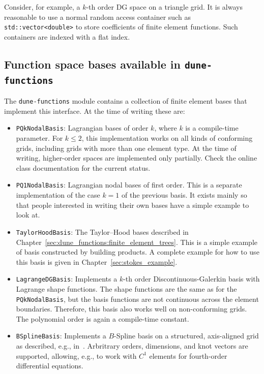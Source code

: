 \documentclass[a4paper,10pt,headings=normal,bibliography=totoc]{scrartcl}
\newcommand{\cpp}[1]{\lstinline[basicstyle=\ttfamily]!#1!}
\newcommand{\dunemodule}[1]{\texttt{#1}}
\begin{document}
Consider, for example, a $k$-th order DG space on a triangle grid.  It is always reasonable to use a normal
random access container such as \cpp{std::vector<double>} to store coefficients of finite element functions.
Such containers are indexed with a flat index.


\subsection{Function space bases available in \texorpdfstring{\dunemodule{dune-functions}}{dune-functions}}

The \dunemodule{dune-functions} module contains a collection of finite element bases that implement
this interface.  At the time of writing these are:

\begin{itemize}
 \item \cpp{PQkNodalBasis}: Lagrangian bases of order $k$, where $k$ is a compile-time parameter.
   For $k\le 2$, this implementation works on all kinds of conforming grids, including grids with more
   than one element type.  At the time of writing, higher-order spaces are implemented only partially.
   Check the online class documentation for the current status.

 \item \cpp{PQ1NodalBasis}: Lagrangian nodal bases of first order.  This is a separate implementation of
   the case $k=1$ of the previous basis.  It exists mainly so that people interested in writing their
   own bases have a simple example to look at.

 \item \cpp{TaylorHoodBasis}: The Taylor--Hood bases described in Chapter~\ref{sec:dune_functions:finite_element_trees}.
   This is a simple example of basis constructed by building products.
   A complete example for how to use this basis is given in Chapter~\ref{sec:stokes_example}.

 \item \cpp{LagrangeDGBasis}: Implements a $k$-th order Discontinuous-Galerkin basis with Lagrange shape functions.
   The shape functions are the same as for the \cpp{PQkNodalBasis},
   but the basis functions are not continuous across the element boundaries.  Therefore, this basis also
   works well on non-conforming grids.  The polynomial order is again a compile-time constant.

 \item \cpp{BSplineBasis}:  Implements a $B$-Spline basis on a structured, axis-aligned grid as described,
   e.g., in~\cite{cottrell_hughes_bazilevs:2009}.  Arbritrary orders, dimensions, and knot vectors are supported,
   allowing, e.g., to work with $C^1$ elements for fourth-order differential equations.


\end{itemize}
\end{document}
